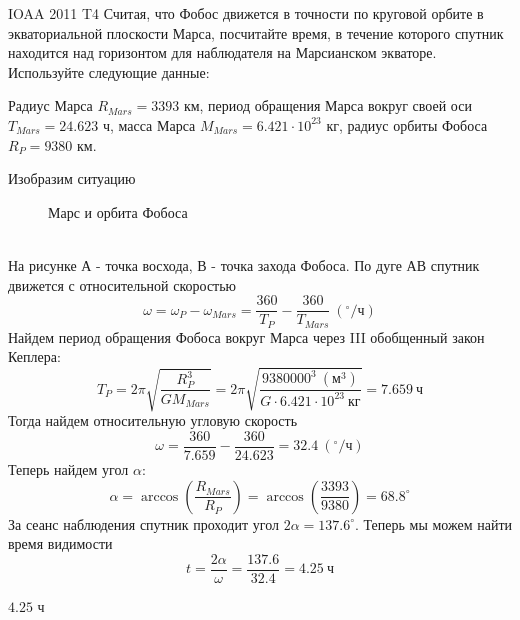 \begin{problem}{IOAA 2011 T4}
	Считая, что Фобос движется в точности по круговой орбите в экваториальной плоскости Марса, посчитайте время, в течение которого спутник находится над горизонтом для наблюдателя на Марсианском экваторе. Используйте следующие данные:

    Радиус Марса $R_{Mars}=3393$ км, период обращения Марса вокруг своей оси $T_{Mars}=24.623$ ч, масса Марса $M_{Mars}=6.421\cdot 10^{23}$ кг, радиус орбиты Фобоса $R_P=9380$ км.

\begin{solution}
	Изобразим ситуацию\\
    \begin{figure}[h]\centering
        
        \caption{Марс и орбита Фобоса\label{2011/T4/duration}}
    \end{figure}\\
    На рисунке А - точка восхода, В - точка захода Фобоса. По дуге АВ спутник движется с относительной скоростью 
    \begin{equation}
        \omega=\omega_P-\omega_{Mars}=\frac{360}{T_P}-\frac{360}{T_{Mars}}~(^{\circ}/\text{ч})
    \end{equation}
    Найдем период обращения Фобоса вокруг Марса через III обобщенный закон Кеплера:
    \begin{equation}
        T_P=2\pi\sqrt{\frac{R^3_P}{GM_{Mars}}}=2\pi\sqrt{\frac{9380000^3~(\text{м$^3$})}{G\cdot 6.421\cdot 10^{23}~\text{кг}}}=7.659~\text{ч}
    \end{equation}
    Тогда найдем относительную угловую скорость
    \begin{equation}
        \omega=\frac{360}{7.659}-\frac{360}{24.623}=32.4~(^{\circ}/\text{ч})
    \end{equation}
    Теперь найдем угол $\alpha$:
    \begin{equation}
        \alpha=\arccos{\left(\frac{R_{Mars}}{R_P}\right)}=\arccos{\left(\frac{3393}{9380}\right)}=68.8^{\circ}
    \end{equation}
    За сеанс наблюдения спутник проходит угол $2\alpha=137.6^{\circ}$. Теперь мы можем найти время видимости
    \begin{equation}
        t=\frac{2\alpha}{\omega}=\frac{137.6}{32.4}=4.25~\text{ч}
    \end{equation}
\end{solution}

\begin{answer}
	$4.25$ ч
\end{answer}
\end{problem}